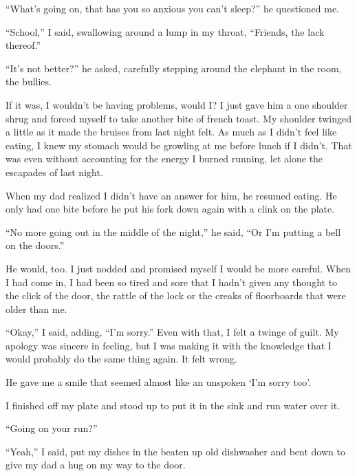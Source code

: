 ``What's going on, that has you so anxious you can't sleep?'' he questioned me.



``School,'' I said, swallowing around a lump in my throat, ``Friends, the lack thereof.''



``It's not better?'' he asked, carefully stepping around the elephant in the room, the bullies.



If it was, I wouldn't be having problems, would I?  I just gave him a one shoulder shrug and forced myself to take another bite of french toast.  My shoulder twinged a little as it made the bruises from last night felt.  As much as I didn't feel like eating, I knew my stomach would be growling at me before lunch if I didn't.  That was even without accounting for the energy I burned running, let alone the escapades of last night.



When my dad realized I didn't have an answer for him, he resumed eating.  He only had one bite before he put his fork down again with a clink on the plate.



``No more going out in the middle of the night,'' he said, ``Or I'm putting a bell on the doors.''



He would, too.  I just nodded and promised myself I would be more careful.  When I had come in, I had been so tired and sore that I hadn't given any thought to the click of the door, the rattle of the lock or the creaks of floorboards that were older than me.



``Okay,'' I said, adding, ``I'm sorry.''  Even with that, I felt a twinge of guilt.  My apology was sincere in feeling, but I was making it with the knowledge that I would probably do the same thing again.  It felt wrong.



He gave me a smile that seemed almost like an unspoken `I'm sorry too'.



I finished off my plate and stood up to put it in the sink and run water over it.



``Going on your run?''



``Yeah,'' I said, put my dishes in the beaten up old dishwasher and bent down to give my dad a hug on my way to the door.



